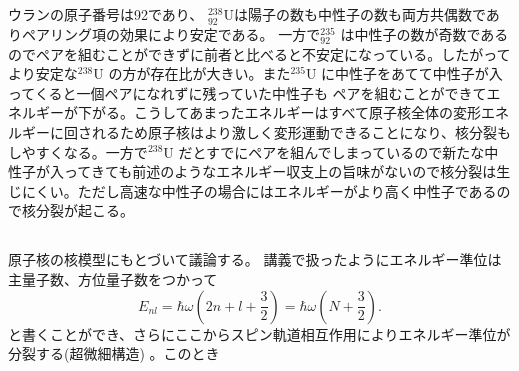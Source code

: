 \documentclass[dvipdfmx]{jsarticle}
\begin{document}
\subsection{}
ウランの原子番号は92であり、
$\mathrm{^{238}_{92}U}$は陽子の数も中性子の数も両方共偶数でありペアリング項の効果により安定である。
一方で$\mathrm{^{235}_{92}}$ は中性子の数が奇数であるのでペアを組むことができずに前者と比べると不安定になっている。したがってより安定な$\mathrm{^{238}U}$ の方が存在比が大きい。また$\mathrm{^{235}U}$ に中性子をあてて中性子が入ってくると一個ペアになれずに残っていた中性子も
ペアを組むことができてエネルギーが下がる。こうしてあまったエネルギーはすべて原子核全体の変形エネルギーに回されるため原子核はより激しく変形運動できることになり、核分裂もしやすくなる。一方で$\mathrm{^{238}U}$ だとすでにペアを組んでしまっているので新たな中性子が入ってきても前述のようなエネルギー収支上の旨味がないので核分裂は生じにくい。ただし高速な中性子の場合にはエネルギーがより高く中性子であるので核分裂が起こる。\\
\subsection{}
原子核の核模型にもとづいて議論する。
講義で扱ったようにエネルギー準位は
主量子数、方位量子数をつかって
\[
E_{nl}=\hbar\omega(2n+l+\frac{3}{2})=\hbar\omega(N+\frac{3}{2})
.\] 
と書くことができ、さらにここからスピン軌道相互作用によりエネルギー準位が分裂する(超微細構造)
。このとき
\end{document}
